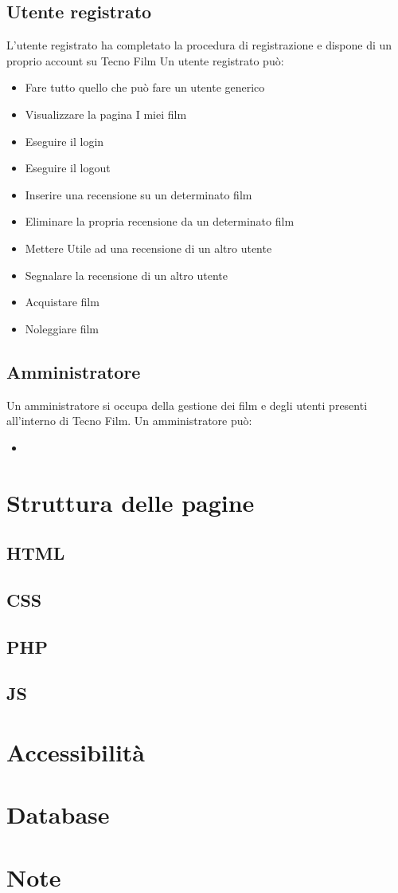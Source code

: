 \documentclass[a4paper]{article}
\begin{document}
\subsection{Utente registrato}
    L'utente registrato ha completato la procedura di registrazione e dispone di un proprio account su Tecno Film
    Un utente registrato pu\`o:
\begin{itemize}
    \item{Fare tutto quello che pu\`o fare un utente generico}
    \item{Visualizzare la pagina I miei film}
    \item{Eseguire il login}
    \item{Eseguire il logout}
    \item{Inserire una recensione su un determinato film}
    \item{Eliminare la propria recensione da un determinato film}
    \item{Mettere Utile ad una recensione di un altro utente}
    \item{Segnalare la recensione di un altro utente}
    \item{Acquistare film}
    \item{Noleggiare film}
\end{itemize}
\subsection{Amministratore}
    Un amministratore si occupa della gestione dei film e degli utenti presenti all'interno di Tecno Film.
    Un amministratore pu\`o:
\begin{itemize}
    \item{}
\end{itemize}
\section{Struttura delle pagine}
\subsection{HTML}
\subsection{CSS}
\subsection{PHP}
\subsection{JS}
\section{Accessibilit\`a}
\section{Database}
\section{Note}
\end{document}
